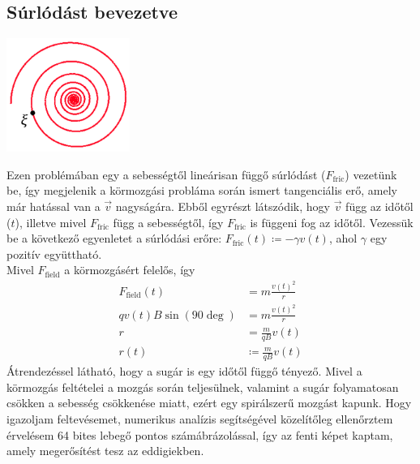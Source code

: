 \documentclass[a4paper]{article}
\begin{document}
\begin{multicols}{2}
\section{Súrlódást bevezetve}
	\begin{center}
		\includegraphics[height=10em]{graphics/spiral.pdf}
	\end{center}
	Ezen problémában egy a sebességtől lineárisan függő súrlódást ($F_{\mathrm{fric}}$) vezetünk be, így megjelenik a körmozgási probláma során ismert tangenciális erő, amely már hatással van a $\vec{v}$ nagyságára. Ebből egyrészt látszódik, hogy $\vec{v}$ függ az időtől ($t$), illetve mivel $F_{\mathrm{fric}}$ függ a sebességtől, így $F_{\mathrm{fric}}$ is függeni fog az időtől. Vezessük be a következő egyenletet a súrlódási erőre: $F_{\mathrm{fric}}(t) \coloneqq - \gamma v(t)$, ahol $\gamma$ egy pozitív együttható. \\
	Mivel $F_{\mathrm{field}}$ a körmozgásért felelős, így
	\begin{align*}
		F_{\mathrm{field}}(t) &= m \frac{v(t)^2}{r} \\
		qv(t)B\sin(90\deg) &= m \frac{v(t)^2}{r} \\
		r &= \frac{m}{qB} v(t) \\
		r(t) &\coloneqq \frac{m}{qB} v(t)
	\end{align*}
	Átrendezéssel látható, hogy a sugár is egy időtől függő tényező. Mivel a körmozgás feltételei a mozgás során teljesülnek, valamint a sugár folyamatosan csökken a sebesség csökkenése miatt, ezért egy spirálszerű mozgást kapunk.
	Hogy igazoljam feltevésemet, numerikus analízis segítségével közelítőleg ellenőrztem érvelésem 64 bites lebegő pontos számábrázolással, így az fenti képet kaptam, amely megerősítést tesz az eddigiekben. 


\end{multicols}
\end{document}
